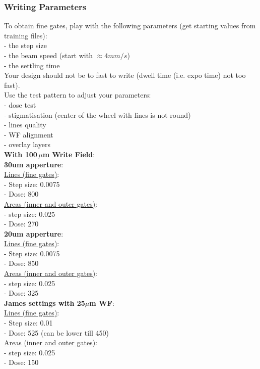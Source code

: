 \subsubsection{Writing Parameters }

To obtain fine gates, play with the following parameters (get starting values from training files):\\
- the step size\\
- the beam speed (start with $\approx 4 mm/s$)\\
- the settling time\\

Your design should not be to fast to write (dwell time (i.e. expo time) not too fast).\\


Use the test pattern to adjust your parameters:\\
- dose test\\
- stigmatisation (center of the wheel with lines is not round)\\
- lines quality\\
- WF alignment\\
- overlay layers\\

\textbf{With 100\,$\mu$m Write Field}:\\

\textbf{30um apperture}:\\

\noindent \underline{Lines (fine gates)}:\\
- Step size: 0.0075\\
- Dose: 800 \\
\underline{Areas (inner and outer gates)}:\\
- step size: 0.025 \\
- Dose: 270\\


\textbf{20um apperture}:\\

\noindent \underline{Lines (fine gates)}:\\
- Step size: 0.0075\\
- Dose: 850 \\
\underline{Areas (inner and outer gates)}:\\
- step size: 0.025 \\
- Dose: 325\\


\textbf{James settings with 25$\mu$m WF}:\\
\underline{Lines (fine gates)}:\\
- Step size: 0.01\\
- Dose: 525 (can be lower till 450)\\
\underline{Areas (inner and outer gates)}:\\
- step size: 0.025 \\
- Dose: 150\\




